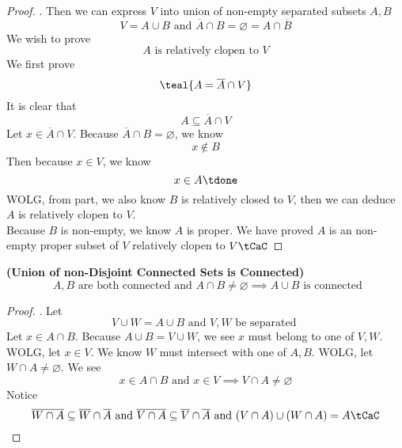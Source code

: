 \documentclass{report}
\begin{document}
\begin{proof}
. Then we can express $V$ into union of non-empty separated subsets $A,B$
 \begin{equation*}
V=A\cup B\text{ and }\overline{A}\cap B=\varnothing=A\cap \overline{B}
\end{equation*}
We wish to prove 
\begin{equation*}
A\text{ is relatively clopen to }V
\end{equation*}
We first prove 
\begin{equation*}
\teal{A=\overline{A}\cap V}
\end{equation*}
It is clear that 
\begin{equation*}
A\subseteq\overline{A}\cap V
\end{equation*}
Let $x\in \overline{A}\cap V$. Because $\overline{A}\cap B=\varnothing$, we know 
\begin{equation*}
x\not\in B
\end{equation*}
Then because $x\in V$, we know 
\begin{equation*}
x\in A\tdone
\end{equation*}
WOLG, from  part, we also know $B$ is relatively closed to $V$, then we can deduce  $A$ is relatively clopen to $V$.\\

Because $B$ is non-empty, we know  $A$ is proper. We have proved  $A$ is an non-empty proper subset of $V$ relatively clopen to  $V\tCaC$ 

\end{proof}
\begin{theorem}
\label{2.3.6}
\textbf{(Union of non-Disjoint Connected Sets is Connected)} 
\begin{equation*}
  \text{ $A,B$ are both connected and }A\cap B\neq \varnothing\implies A\cup  B\text{ is connected } 
\end{equation*}
\end{theorem}
\begin{proof}
. Let
\begin{equation*}
V\cup W=A\cup B\text{ and }V,W\text{ be separated }
\end{equation*}
Let $x\in A\cap B$. Because $A\cup B=V\cup W$, we see $x$ must belong to one of  $V,W$. WOLG, let  $x\in V$. We know $W$ must intersect with one of $A,B$. WOLG, let  $W\cap  A\neq \varnothing$. We see 
\begin{equation*}
x\in A\cap B\text{ and }x\in V\implies V\cap A\neq \varnothing
\end{equation*}
Notice
\begin{equation*}
\overline{W\cap A}\subseteq \overline{W}\cap \overline{A}\text{ and }\overline{V\cap A}\subseteq \overline{V}\cap \overline{A}\text{ and }(V\cap A)\cup (W\cap A)=A\tCaC
\end{equation*}
\end{proof}
\end{document}

